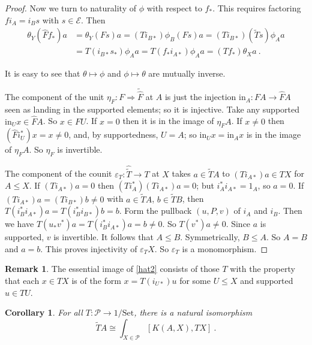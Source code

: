 \documentclass[a4paper,12pt,reqno]{amsart}
\newtheorem{corollary}[theorem]{Corollary}
\theoremstyle{definition}
\newtheorem{remark}[theorem]{Remark}
\theoremstyle{fact}
\theoremstyle{genquest}
\theoremstyle{step}
\newcommand{\lra}{\longrightarrow}
\newcommand{\Lra}{\Longrightarrow}
\def\CE{{\mathscr E}}
\def\CP{{\mathscr P}}
\begin{document}
\begin{proof}
Now we turn to naturality of $\phi$ with respect to $f_*$. This requires factoring
$f i_A = i_B s$ with $s\in \CE$. Then
\begin{align*}
\theta_Y(\widehat{F}f_*)a & = \theta_Y(Fs)a  = (Ti_{B*})\phi_B(Fs)a = (Ti_{B*})(\widetilde{T}s)\phi_Aa \\  
& = T(i_{B*}s_*)\phi_Aa = T(f_*i_{A*})\phi_Aa  = (Tf_*)\theta_Xa \ .
\end{align*}

It is easy to see that $\theta \mapsto \phi$ and $\phi \mapsto \theta$ are mutually inverse.  

The component of the unit $\eta_F : F \Lra \widetilde{\widehat{F}}$ at $A$ is
just the injection $\mathrm{in}_A : FA \lra \widehat{F}A$ seen as landing in
the supported elements; so it is injective.  
Take any supported $\mathrm{in}_Ux \in \widehat{F}A$. 
So $x\in FU$. If $x=0$ then it is in the image of $\eta_FA$.
If $x\neq 0$ then $(\widehat{F}i_U^*)x = x \neq 0$, and, by supportedness,
$U = A$; so $\mathrm{in}_Ux = \mathrm{in}_Ax$ is in the image of $\eta_FA$. 
So $\eta_F$ is invertible. 

The component of the counit $\varepsilon_T : \widehat{\widetilde{T}} \lra T$
at $X$ takes $a\in \widetilde{T}A$ to $(Ti_{A*})a \in TX$ for $A\le X$.  
If $(Ti_{A*})a = 0$ then $(Ti_A^*)(Ti_{A*})a = 0$; but $i_A^*i_{A*} = 1_A$,
so $a=0$. If $(Ti_{A*})a = (Ti_{B*})b \neq 0$ with $a\in \widetilde{T}A$,
$b\in \widetilde{T}B$, then $T(i_B^*i_{A*})a = T(i_B^*i_{B*})b = b$.
Form the pullback $(u,P,v)$ of $i_A$ and $i_B$. Then we have
$T(u_*v^*)a = T(i_B^*i_{A*})a = b \neq 0$. So $T(v^*)a \neq 0$.
Since $a$ is supported, $v$ is invertible. It follows that $A\le B$.
Symmetrically, $B\le A$. So $A = B$ and $a = b$.
This proves injectivity of $\varepsilon_TX$. So $\varepsilon_T$ is
a monomorphism.       
\end{proof}

\begin{remark}
The essential image of \eqref{hat2} consists of those $T$ with the property that
each $x\in TX$ is of the form $x=T(i_{U*})u$ for some $U\le X$ and
supported $u\in TU$.
\end{remark}

\begin{corollary}\label{endfortilde} 
For all $T:\CP \lra 1/\mathrm{Set}$, there is a natural isomorphism
$$\widetilde{T}A\cong \int_{X\in \CP}{[K(A,X), TX]} \ .$$
\end{corollary}
\end{document}
